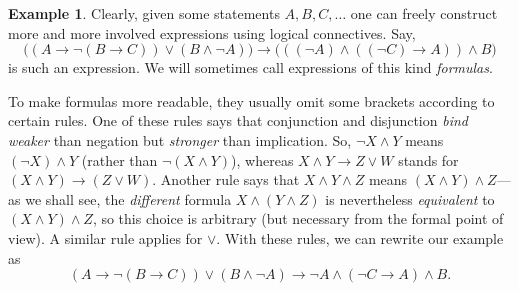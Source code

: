 \documentclass[12pt,notitlepage]{article}
\theoremstyle{plain}
\theoremstyle{definition}
\newtheorem{exm}[thm]{Example}
\theoremstyle{plain}
\newcommand{\1}{\mathbf{1}}
\newcommand{\0}{\mathbf{0}}
\begin{document}
\begin{exm}
Clearly, given some statements $A, B, C,\dots$ one can freely construct more and more involved expressions using logical connectives. Say, 
$$\bigl((A \to \neg(B \to C)) \vee (B \wedge \neg A)\bigr) \to \bigl(((\neg A) \wedge ((\neg C) \to A)) \wedge B \bigr)$$
is such an expression. We will sometimes call expressions of this kind \emph{formulas}.

To make formulas more readable, they usually omit some brackets according to certain rules. One of these rules says that conjunction and disjunction \emph{bind weaker} than negation but \emph{stronger} than implication. So, $\neg X \wedge Y$ means $(\neg X) \wedge Y$ (rather than $\neg (X \wedge Y)$), whereas $X \wedge Y \to Z \vee W$ stands for $(X \wedge Y) \to (Z \vee W)$. Another rule says that $X \wedge Y \wedge Z$ means $(X \wedge Y) \wedge Z$---as we shall see, the \emph{different} formula $X \wedge (Y \wedge Z)$ is nevertheless \emph{equivalent} to $(X \wedge Y) \wedge Z$, so this choice is arbitrary (but necessary from the formal point of view). A similar rule applies for ${\vee}$. With these rules, we can rewrite our example as
$$(A \to \neg(B \to C)) \vee (B \wedge \neg A) \to \neg A \wedge (\neg C \to A) \wedge B.$$
\end{exm}
\end{document}
